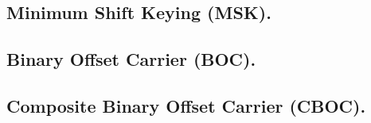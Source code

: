 \subsection*{\fontsize{12}{18}\selectfont Minimum Shift Keying (MSK).}

\begin{justify}
\end{justify}

\subsection*{\fontsize{12}{18}\selectfont Binary Offset Carrier (BOC).}

\begin{justify}
\end{justify}

\subsection*{\fontsize{12}{18}\selectfont Composite Binary Offset Carrier (CBOC).}

\begin{justify}
\end{justify}